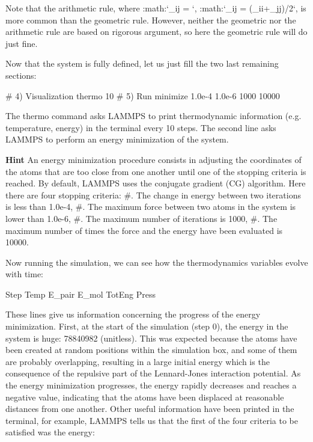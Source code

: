 Note that the arithmetic rule, where 
:math:`\epsilon_{ij} = `,
:math:`\sigma_{ij} = (\sigma_{ii}+\sigma_{jj})/2`, 
is more common than the geometric rule. However, neither the geometric nor the
arithmetic rule are based on rigorous argument, so here
the geometric rule will do just fine. 






Now that the system is fully defined, let us just fill the two last remaining sections:



\begin{lcverbatim}
# 4) Visualization
thermo 10
# 5) Run
minimize 1.0e-4 1.0e-6 1000 10000
\end{lcverbatim}

The thermo command asks LAMMPS to print
thermodynamic information (e.g. temperature, energy) in the
terminal every 10 steps. The second line asks LAMMPS to
perform an energy minimization of the system.


\textbf{Hint} An energy minimization procedure consists in adjusting
the coordinates of the atoms that are too close from one another until one of the stopping
criteria is reached. By default, LAMMPS uses the conjugate gradient (CG) algorithm.
Here there are four stopping criteria:
#. The change in energy between two iterations is less than 1.0e-4,
#. The maximum force between two atoms in the system is lower than 1.0e-6,
#. The maximum number of iterations is 1000,
#. The maximum number of times the force and the energy have been evaluated is 10000.


Now running the simulation, we can see how the thermodynamics
variables evolve with time:



\begin{lcverbatim}
Step         Temp       E_pair        E_mol       TotEng         Press
\end{lcverbatim}

These lines give us information concerning
the progress of the energy minimization. First, at the start
of the simulation (step 0), the energy in the system is
huge: 78840982 (unitless). This was expected because
the atoms have been created at random positions within the
simulation box, and some of them are probably overlapping,
resulting in a large initial energy which is the consequence
of the repulsive part of the Lennard-Jones interaction
potential. As the energy minimization progresses, the energy
rapidly decreases and reaches a negative value, indicating that the atoms have been
displaced at reasonable distances from one another. Other
useful information have been printed in the terminal, for
example, LAMMPS tells us that the first of the four criteria
to be satisfied was the energy:



